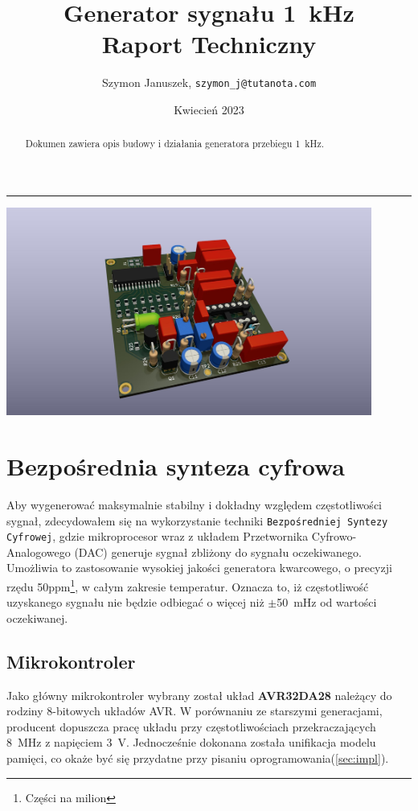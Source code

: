 \documentclass[12pt, a4paper]{article}
\title{
	Generator sygnału \qty{1}{\kHz}\\
	\large Raport Techniczny
}
\author{Szymon Januszek, \texttt{szymon\_j@tutanota.com}}
\date{Kwiecień 2023}
\begin{document}
\normalfont
{}
\maketitle
\hrule

\begin{abstract}
	Dokumen zawiera opis budowy i działania generatora przebiegu \qty{1}{\kHz}.
\end{abstract}

\begin{center}
	\includegraphics[width=0.9\textwidth]{img/board_render_1.jpg}
\end{center}


\newpage

\tableofcontents

\newpage

\section{Bezpośrednia synteza cyfrowa}

Aby wygenerować maksymalnie stabilny i dokładny względem częstotliwości sygnał, 
zdecydowałem się na wykorzystanie techniki \verb|Bezpośredniej Syntezy Cyfrowej|, 
gdzie mikroprocesor wraz z układem Przetwornika Cyfrowo-Analogowego (DAC) generuje sygnał zbliżony do sygnału oczekiwanego. 
Umożliwia to zastosowanie wysokiej jakości generatora kwarcowego, o precyzji rzędu 50ppm\footnote{Części na milion}, 
w całym zakresie temperatur. Oznacza to, iż częstotliwość uzyskanego sygnału nie będzie odbiegać o więcej niż $\pm$\qty{50}{\mHz} od wartości oczekiwanej. 

\subsection{Mikrokontroler}
Jako główny mikrokontroler wybrany został układ \textbf{AVR32DA28}\cite{avr-datasheet} należący do rodziny 8-bitowych układów AVR.
W porównaniu ze starszymi generacjami, producent dopuszcza pracę układu przy częstotliwościach przekraczających \qty{8}{\MHz} z napięciem \qty{3}{\volt}.
Jednocześnie dokonana została unifikacja modelu pamięci, co okaże być się przydatne przy pisaniu oprogramowania(\ref{sec:impl}).
\end{document}
